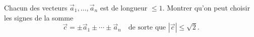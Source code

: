 Chacun des vecteurs $\vec a_1, \ldots, \vec a_n$ est de longueur $\leq 1$. Montrer qu'on peut choisir les signes de la somme
\[ \vec c = \pm\vec a_1 \pm \cdots \pm \vec a_n \quad\text{de sorte que } |\vec c| \leq \sqrt{2}. \]
